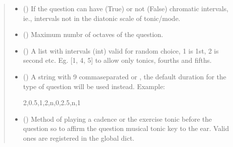 \documentclass[letterpaper,10pt,english]{sphinxmanual}
\begin{document}
\begin{fulllineitems}
\begin{fulllineitems}
\begin{quote}
\begin{description}
\begin{itemize}
\item {} 
\sphinxAtStartPar
{} () \textendash{} If the question can have (True) or not
(False) chromatic intervals, ie., intervals not in the
diatonic scale of tonic/mode.

\item {} 
\sphinxAtStartPar
{} () \textendash{} Maximum numbr of octaves of the question.

\item {} 
\sphinxAtStartPar
{} () \textendash{} A list with intervals (int) valid for
random choice, 1 is 1st, 2 is second etc. Eg. {[}1, 4, 5{]} to
allow only tonics, fourths and fifths.

\item {} 
\sphinxAtStartPar
{} () \textendash{} 
\sphinxAtStartPar
A string with 9 comma\sphinxhyphen{}separated  or
, the
default duration for the type of question will be used instead.
Example:

\begin{sphinxVerbatim}[commandchars=\\\{\}]
\PYGZdq{}2,0.5,1,2,n,0,2.5,n,1\PYGZdq{}
\end{sphinxVerbatim}


\item {} 
\sphinxAtStartPar
{} () \textendash{} Method of playing a cadence or the
exercise tonic before the question so to affirm the question
musical tonic key to the ear. Valid ones are registered in the
 global dict.


\end{itemize}
\end{description}
\end{quote}
\end{fulllineitems}
\end{fulllineitems}
\end{document}

